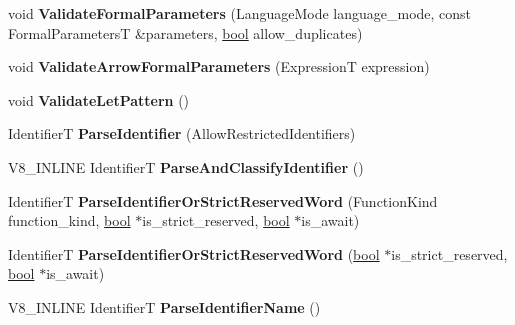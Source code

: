 \begin{DoxyCompactItemize}
void {\bfseries Validate\+Formal\+Parameters} (Language\+Mode language\+\_\+mode, const Formal\+ParametersT \&parameters, \mbox{\hyperlink{classbool}{bool}} allow\+\_\+duplicates)
\item 
\mbox{\label{classv8_1_1internal_1_1ParserBase_a2eb6f7b633d875ebd1c1fb5ecbd820bb}} 
void {\bfseries Validate\+Arrow\+Formal\+Parameters} (ExpressionT expression)
\item 
\mbox{\label{classv8_1_1internal_1_1ParserBase_a53dc9397ebfc6fa78cf7f255fb6fa425}} 
void {\bfseries Validate\+Let\+Pattern} ()
\item 
\mbox{\label{classv8_1_1internal_1_1ParserBase_ad86418358ddfe564d9cc831e0743ebbd}} 
IdentifierT {\bfseries Parse\+Identifier} (Allow\+Restricted\+Identifiers)
\item 
\mbox{\label{classv8_1_1internal_1_1ParserBase_a91d36bd12b6cda5497e2a915895533af}} 
V8\+\_\+\+I\+N\+L\+I\+NE IdentifierT {\bfseries Parse\+And\+Classify\+Identifier} ()
\item 
\mbox{\label{classv8_1_1internal_1_1ParserBase_a30949820f53071f2e1f8c3af3c91946b}} 
IdentifierT {\bfseries Parse\+Identifier\+Or\+Strict\+Reserved\+Word} (Function\+Kind function\+\_\+kind, \mbox{\hyperlink{classbool}{bool}} $\ast$is\+\_\+strict\+\_\+reserved, \mbox{\hyperlink{classbool}{bool}} $\ast$is\+\_\+await)
\item 
\mbox{\label{classv8_1_1internal_1_1ParserBase_ae76df3cfe26278fec6ad612360563e0e}} 
IdentifierT {\bfseries Parse\+Identifier\+Or\+Strict\+Reserved\+Word} (\mbox{\hyperlink{classbool}{bool}} $\ast$is\+\_\+strict\+\_\+reserved, \mbox{\hyperlink{classbool}{bool}} $\ast$is\+\_\+await)
\item 
\mbox{\label{classv8_1_1internal_1_1ParserBase_ae1d131cdc00abf9931f37c257d77cea6}} 
V8\+\_\+\+I\+N\+L\+I\+NE IdentifierT {\bfseries Parse\+Identifier\+Name} ()
\item 
\mbox{\label{classv8_1_1internal_1_1ParserBase_a576845e25dce3f487a7188bf1a5a41c3}} 

\end{DoxyCompactItemize}
